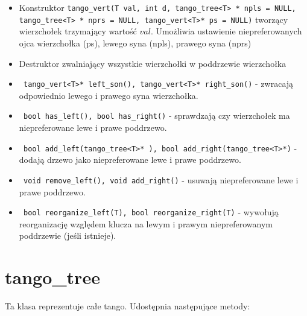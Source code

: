 \documentclass[declaration,shortabstract]{iithesis}
\theoremstyle{thm}
\theoremstyle{remark}
\theoremstyle{plain}
\theoremstyle{plain}
\theoremstyle{plain}
\begin{document}
\begin{itemize}

\item{Konstruktor \texttt{tango\_vert(T val, int d, tango\_tree<T> * npls = NULL, tango\_tree<T> * nprs = NULL, tango\_vert<T>* ps = NULL)} tworzący wierzchołek trzymający wartość $val$. Umożliwia ustawienie niepreferowanych ojca wierzchołka (ps), lewego syna (npls), prawego syna (nprs)}

\item{Destruktor zwalniający wszystkie wierzchołki w poddrzewie wierzchołka}

\item{\texttt{  tango\_vert<T>* left\_son(), tango\_vert<T>* right\_son()} - zwracają odpowiednio lewego i prawego syna wierzchołka. }
    
\item{\texttt{  bool has\_left(), bool has\_right()} - sprawdzają czy wierzchołek ma niepreferowane lewe i prawe poddrzewo. }

\item{\texttt{  bool add\_left(tango\_tree<T>* ), bool add\_right(tango\_tree<T>*)} - dodają drzewo jako niepreferowane lewe i prawe poddrzewo. }

\item{\texttt{  void remove\_left(), void add\_right()} - usuwają niepreferowane lewe i prawe poddrzewo. }


\item{\texttt{ bool reorganize\_left(T), bool reorganize\_right(T)} - wywołują reorganizację względem klucza na lewym i prawym niepreferowanym poddrzewie (jeśli istnieje). }

\end{itemize}

\section{tango\_tree}

Ta klasa reprezentuje całe tango.  Udostępnia następujące metody: 
\end{document}
